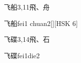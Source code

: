 \begin{Entry}{飞船}{3,11}{⾶、⾈}
  \begin{Phonetics}{飞船}{fei1 chuan2}[][HSK 6]
  \end{Phonetics}
\end{Entry}

\begin{Entry}{飞碟}{3,14}{⾶、⽯}
  \begin{Phonetics}{飞碟}{fei1die2}
  \end{Phonetics}
\end{Entry}


